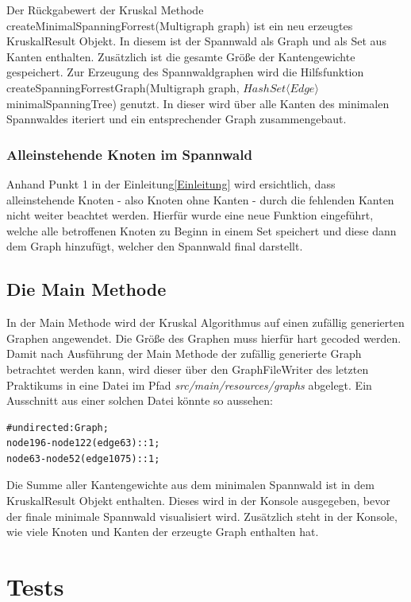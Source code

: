 \documentclass[a4paper]{article}
\begin{document}
Der Rückgabewert der Kruskal Methode createMinimalSpanningForrest(Multigraph graph) ist ein neu erzeugtes KruskalResult Objekt. In diesem ist der Spannwald als Graph und als Set aus Kanten enthalten. Zusätzlich ist die gesamte Größe der Kantengewichte gespeichert. Zur Erzeugung des Spannwaldgraphen wird die Hilfsfunktion createSpanningForrestGraph(Multigraph graph, $HashSet\langle Edge\rangle$ minimalSpanningTree) genutzt. In dieser wird über alle Kanten des minimalen Spannwaldes iteriert und ein entsprechender Graph zusammengebaut. 

\subsubsection{Alleinstehende Knoten im Spannwald}

Anhand Punkt 1 in der Einleitung\ref{Einleitung} wird ersichtlich, dass alleinstehende Knoten - also Knoten ohne Kanten - durch die fehlenden Kanten nicht weiter beachtet werden. Hierfür wurde eine neue Funktion eingeführt, welche alle betroffenen Knoten zu Beginn in einem Set speichert und diese dann dem Graph hinzufügt, welcher den Spannwald final darstellt. 

\subsection{Die Main Methode}

In der Main Methode wird der Kruskal Algorithmus auf einen zufällig generierten Graphen angewendet. Die Größe des Graphen muss hierfür hart gecoded werden. Damit nach Ausführung der Main Methode der zufällig generierte Graph betrachtet werden kann, wird dieser über den GraphFileWriter des letzten Praktikums in eine Datei im Pfad \textit{src/main/resources/graphs} abgelegt. Ein Ausschnitt aus einer solchen Datei könnte so aussehen:

\begin{lstlisting}[frame = trBL]
#undirected:Graph;
node196-node122(edge63)::1;
node63-node52(edge1075)::1;
\end{lstlisting}

Die Summe aller Kantengewichte aus dem minimalen Spannwald ist in dem KruskalResult Objekt enthalten. Dieses wird in der Konsole ausgegeben, bevor der finale minimale Spannwald visualisiert wird. Zusätzlich steht in der Konsole, wie viele Knoten und Kanten der erzeugte Graph enthalten hat.

\newpage

\section{Tests}
\end{document}
